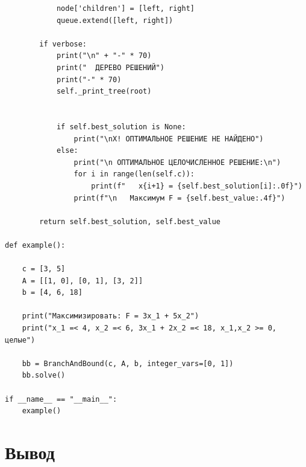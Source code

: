 \documentclass[oneside,a4paper,14pt]{extarticle}
\begin{document}
\begin{verbatim}
            node['children'] = [left, right]
            queue.extend([left, right])

        if verbose:
            print("\n" + "-" * 70)
            print("  ДЕРЕВО РЕШЕНИЙ")
            print("-" * 70)
            self._print_tree(root)


            if self.best_solution is None:
                print("\nX! ОПТИМАЛЬНОЕ РЕШЕНИЕ НЕ НАЙДЕНО")
            else:
                print("\n ОПТИМАЛЬНОЕ ЦЕЛОЧИСЛЕННОЕ РЕШЕНИЕ:\n")
                for i in range(len(self.c)):
                    print(f"   x{i+1} = {self.best_solution[i]:.0f}")
                print(f"\n   Максимум F = {self.best_value:.4f}")

        return self.best_solution, self.best_value

def example():

    c = [3, 5]
    A = [[1, 0], [0, 1], [3, 2]]
    b = [4, 6, 18]

    print("Максимизировать: F = 3x_1 + 5x_2")
    print("x_1 =< 4, x_2 =< 6, 3x_1 + 2x_2 =< 18, x_1,x_2 >= 0, целые")

    bb = BranchAndBound(c, A, b, integer_vars=[0, 1])
    bb.solve()

if __name__ == "__main__":
    example()

\end{verbatim}

\newpage
\section*{Вывод}
\end{document}
